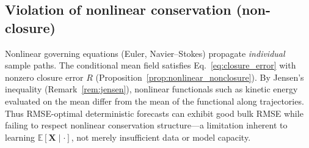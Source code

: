 \subsection{Violation of nonlinear conservation (non-closure)}
\label{subsec:nonconservation}

Nonlinear governing equations (Euler, Navier--Stokes) propagate \emph{individual} sample paths.
The conditional mean field satisfies Eq.~\eqref{eq:closure_error} with nonzero closure error $R$ (Proposition~\ref{prop:nonlinear_nonclosure}).
By Jensen's inequality (Remark~\ref{rem:jensen}), nonlinear functionals such as kinetic energy evaluated on the mean differ from the mean of the functional along trajectories.
Thus RMSE-optimal deterministic forecasts can exhibit good bulk RMSE while failing to respect nonlinear conservation structure---a limitation inherent to learning $\mathbb{E}[\mathbf{X}\mid\cdot]$, not merely insufficient data or model capacity.

